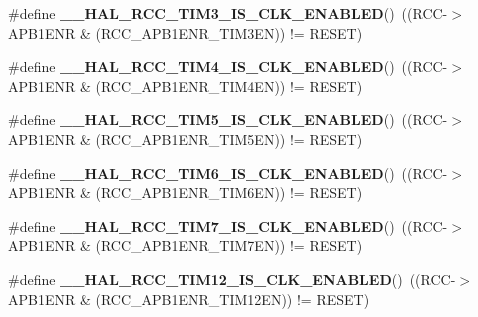 \begin{DoxyCompactItemize}
\#define {\bfseries \+\_\+\+\_\+\+H\+A\+L\+\_\+\+R\+C\+C\+\_\+\+T\+I\+M3\+\_\+\+I\+S\+\_\+\+C\+L\+K\+\_\+\+E\+N\+A\+B\+L\+ED}()~((R\+CC-\/$>$A\+P\+B1\+E\+NR \& (R\+C\+C\+\_\+\+A\+P\+B1\+E\+N\+R\+\_\+\+T\+I\+M3\+EN)) != R\+E\+S\+ET)
\item 
\mbox{\label{group___r_c_c_ex___peripheral___clock___enable___disable___status_ga62bee605d886067f86f890ee3af68eb5}} 
\#define {\bfseries \+\_\+\+\_\+\+H\+A\+L\+\_\+\+R\+C\+C\+\_\+\+T\+I\+M4\+\_\+\+I\+S\+\_\+\+C\+L\+K\+\_\+\+E\+N\+A\+B\+L\+ED}()~((R\+CC-\/$>$A\+P\+B1\+E\+NR \& (R\+C\+C\+\_\+\+A\+P\+B1\+E\+N\+R\+\_\+\+T\+I\+M4\+EN)) != R\+E\+S\+ET)
\item 
\mbox{\label{group___r_c_c_ex___peripheral___clock___enable___disable___status_ga76f0a16fed0812fbab8bf15621939c8b}} 
\#define {\bfseries \+\_\+\+\_\+\+H\+A\+L\+\_\+\+R\+C\+C\+\_\+\+T\+I\+M5\+\_\+\+I\+S\+\_\+\+C\+L\+K\+\_\+\+E\+N\+A\+B\+L\+ED}()~((R\+CC-\/$>$A\+P\+B1\+E\+NR \& (R\+C\+C\+\_\+\+A\+P\+B1\+E\+N\+R\+\_\+\+T\+I\+M5\+EN)) != R\+E\+S\+ET)
\item 
\mbox{\label{group___r_c_c_ex___peripheral___clock___enable___disable___status_gabb273361eaae66c857b5db26b639ff45}} 
\#define {\bfseries \+\_\+\+\_\+\+H\+A\+L\+\_\+\+R\+C\+C\+\_\+\+T\+I\+M6\+\_\+\+I\+S\+\_\+\+C\+L\+K\+\_\+\+E\+N\+A\+B\+L\+ED}()~((R\+CC-\/$>$A\+P\+B1\+E\+NR \& (R\+C\+C\+\_\+\+A\+P\+B1\+E\+N\+R\+\_\+\+T\+I\+M6\+EN)) != R\+E\+S\+ET)
\item 
\mbox{\label{group___r_c_c_ex___peripheral___clock___enable___disable___status_ga5642c4226ce18792efeca9d39cb0c5e0}} 
\#define {\bfseries \+\_\+\+\_\+\+H\+A\+L\+\_\+\+R\+C\+C\+\_\+\+T\+I\+M7\+\_\+\+I\+S\+\_\+\+C\+L\+K\+\_\+\+E\+N\+A\+B\+L\+ED}()~((R\+CC-\/$>$A\+P\+B1\+E\+NR \& (R\+C\+C\+\_\+\+A\+P\+B1\+E\+N\+R\+\_\+\+T\+I\+M7\+EN)) != R\+E\+S\+ET)
\item 
\mbox{\label{group___r_c_c_ex___peripheral___clock___enable___disable___status_ga7afed5bd30e0175ae5e46e78173b112f}} 
\#define {\bfseries \+\_\+\+\_\+\+H\+A\+L\+\_\+\+R\+C\+C\+\_\+\+T\+I\+M12\+\_\+\+I\+S\+\_\+\+C\+L\+K\+\_\+\+E\+N\+A\+B\+L\+ED}()~((R\+CC-\/$>$A\+P\+B1\+E\+NR \& (R\+C\+C\+\_\+\+A\+P\+B1\+E\+N\+R\+\_\+\+T\+I\+M12\+EN)) != R\+E\+S\+ET)

\end{DoxyCompactItemize}
